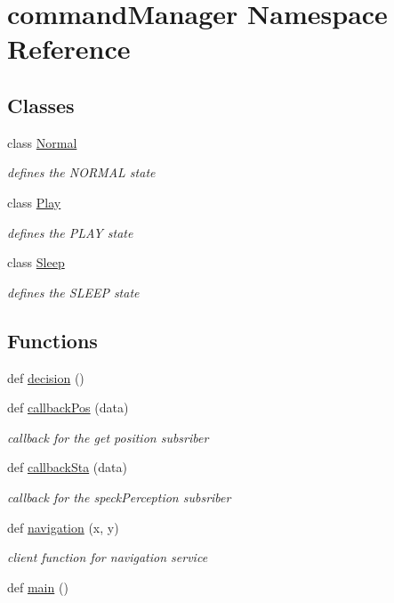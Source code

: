\hypertarget{namespacecommandManager}{}\section{command\+Manager Namespace Reference}
\label{namespacecommandManager}
\subsection*{Classes}
\begin{DoxyCompactItemize}
\item 
class \hyperlink{classcommandManager_1_1Normal}{Normal}
\begin{DoxyCompactList}\small\item\em defines the N\+O\+R\+M\+AL state \end{DoxyCompactList}\item 
class \hyperlink{classcommandManager_1_1Play}{Play}
\begin{DoxyCompactList}\small\item\em defines the P\+L\+AY state \end{DoxyCompactList}\item 
class \hyperlink{classcommandManager_1_1Sleep}{Sleep}
\begin{DoxyCompactList}\small\item\em defines the S\+L\+E\+EP state \end{DoxyCompactList}\end{DoxyCompactItemize}
\subsection*{Functions}
\begin{DoxyCompactItemize}
\item 
def \hyperlink{namespacecommandManager_a4b8947837e5d1af29943bfcf09e748f4}{decision} ()
\item 
def \hyperlink{namespacecommandManager_afef8f89a2132d42ee1e538e12cca47ec}{callback\+Pos} (data)
\begin{DoxyCompactList}\small\item\em callback for the get position subsriber \end{DoxyCompactList}\item 
def \hyperlink{namespacecommandManager_a17f50b385bbd12f96d20b91e1fb43e93}{callback\+Sta} (data)
\begin{DoxyCompactList}\small\item\em callback for the speck\+Perception subsriber \end{DoxyCompactList}\item 
def \hyperlink{namespacecommandManager_a39a4b5ee79aceca08d85ee68043b46ad}{navigation} (x, y)
\begin{DoxyCompactList}\small\item\em client function for navigation service \end{DoxyCompactList}\item 
def \hyperlink{namespacecommandManager_ae8b570eb4bf393859bc74c9cb5fe125f}{main} ()
\end{DoxyCompactItemize}
